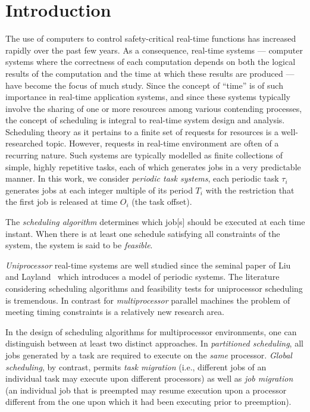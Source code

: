 \documentclass[a4paper,11pt]{article}
\begin{document}
\section{Introduction} \label{intro} The use of computers to control
safety-critical real-time functions has increased rapidly over the
past few years. As a consequence, real-time systems --- computer
systems where the correctness of each computation depends on both the
logical results of the computation and the time at which these results
are produced --- have become the focus of much study. Since the
concept of ``time'' is of such importance in real-time application
systems, and since these systems typically involve the sharing of one
or more resources among various contending processes, the concept of
scheduling is integral to real-time system design and
analysis. Scheduling theory as it pertains to a finite set of requests
for resources is a well-researched topic. However, requests in
real-time environment are often of a recurring nature. Such systems
are typically modelled as finite collections of simple, highly
repetitive tasks, each of which generates jobs in a very predictable
manner. In this work, we consider \emph{periodic task systems}, each periodic 
task $\tau_{i}$ generates jobs at each integer multiple of its period $T_i$ with the restriction that the first job is released at time $O_i$ (the task
offset).



The \emph{scheduling algorithm} determines which job[s] should be
executed at each time instant. When there is at least one schedule
satisfying all constraints of the system, the system is said to be
\emph{feasible}.

\emph{Uniprocessor} real-time systems are well studied since the
seminal paper of Liu and Layland~\cite{Liu} which introduces a model
of periodic systems. The literature considering scheduling algorithms
and feasibility tests for uniprocessor scheduling is tremendous. In
contrast for \emph{multiprocessor} parallel machines the problem of
meeting timing constraints is a relatively new research area.



In the design of scheduling algorithms for multiprocessor environments,
one can distinguish between at least two distinct approaches. In
\emph{partitioned scheduling}, all jobs generated by a task are
required to execute on the \emph{same} processor. \emph{Global scheduling},
by contrast, permits \emph{task migration} (i.e., different jobs of an
individual task may execute upon different processors) as well as \emph{job
migration} (an individual job that is preempted may resume execution
upon a processor different from the one upon which it had been
executing prior to preemption).
\end{document}
